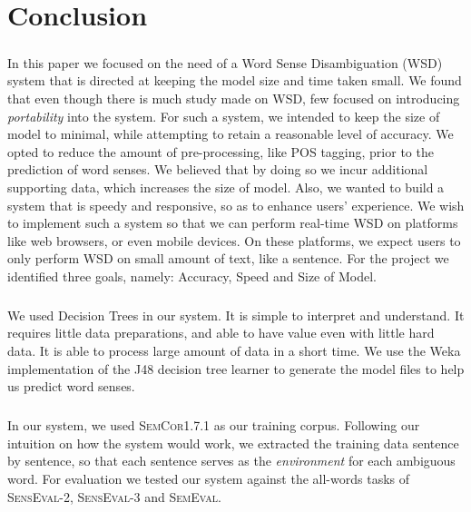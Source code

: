 \chapter{Conclusion}
\label{conclusion}
\paragraph{}
In this paper we focused on the need of a Word Sense Disambiguation (WSD) system that is directed at keeping the model size and time taken small. We found that even though there is much study made on WSD, few focused on introducing \textit{portability} into the system. For such a system, we intended to keep the size of model to minimal, while attempting to retain a reasonable level of accuracy. We opted to reduce the amount of pre-processing, like POS tagging, prior to the prediction of word senses. We believed that by doing so we incur additional supporting data, which increases the size of model. Also, we wanted to build a system that is speedy and responsive, so as to enhance users' experience. We wish to implement such a system so that we can perform real-time WSD on platforms like web browsers, or even mobile devices. On these platforms, we expect users to only perform WSD on small amount of text, like a sentence. For the project we identified three goals, namely: Accuracy, Speed and Size of Model.
\paragraph{}
We used Decision Trees in our system. It is simple to interpret and understand. It requires little data preparations, and able to have value even with little hard data. It is able to process large amount of data in a short time. We use the Weka implementation of the J48 decision tree learner to generate the model files to help us predict word senses.

\paragraph{}
In our system, we used \textsc{SemCor1.7.1} as our training corpus. Following our intuition on how the system would work, we extracted the training data sentence by sentence, so that each sentence serves as the \textit{environment} for each ambiguous word. For evaluation we tested our system against the all-words tasks of \textsc{SensEval-2}, \textsc{SensEval-3} and \textsc{SemEval}.

